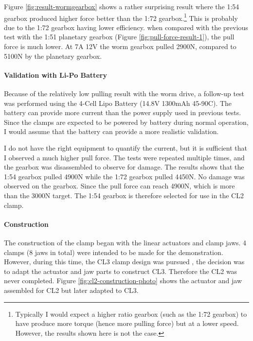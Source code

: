 Figure \ref{fig:result-wormgearbox} shows a rather surprising result where the 1:54 gearbox produced higher force better than the 1:72 gearbox.\footnote{Typically I would expect a higher ratio gearbox (such as the 1:72 gearbox) to have produce more torque (hence more pulling force) but at a lower speed. However, the results shown here is not the case.} This is probably due to the 1:72 gearbox having lower efficiency. when compared with the previous test with the 1:51 planetary gearbox (Figure \ref{fig:pull-force-result-1}), the pull force is much lower. At 7A 12V the worm gearbox pulled 2900N, compared to 5100N by the planetary gearbox.

\paragraph{Validation with Li-Po Battery}


Because of the relatively low pulling result with the worm drive, a follow-up test was performed using the 4-Cell Lipo Battery (14.8V 1300mAh 45-90C). The battery can provide more current than the power supply used in previous tests. Since the clamps are expected to be powered by battery during normal operation, I would assume that the battery can provide a more realistic validation.

I do not have the right equipment to quantify the current, but it is sufficient that I observed a much higher pull force. The tests were repeated multiple times, and the gearbox was disassembled to observe for damage. The results shows that the 1:54 gearbox pulled 4900N while the 1:72 gearbox pulled 4450N. No damage was observed on the gearbox. Since the pull force can reach 4900N, which is more than the 3000N target. The 1:54 gearbox is therefore selected for use in the CL2 clamp.

\paragraph{Construction}

The construction of the clamp began with the linear actuators and clamp jaws. 4 clamps (8 jaws in total) were intended to be made for the demonstration. However, during this time, the CL3 clamp design was pursued , the decision was to adapt the actuator and jaw parts to construct CL3. Therefore the CL2 was never completed. Figure \ref{fig:cl2-construction-photo} shows the actuator and jaw assembled for CL2 but later adapted to CL3.


